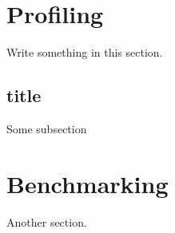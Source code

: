 \section{Profiling}
Write something in this section.

\subsection{title}
Some subsection 

\section{Benchmarking}
Another section.